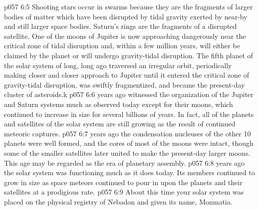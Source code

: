 \vs p057 6:5 Shooting stars occur in swarms because they are the fragments of larger bodies of matter which have been disrupted by tidal gravity exerted by near\hyp{}by and still larger space bodies. Saturn’s rings are the fragments of a disrupted satellite. One of the moons of Jupiter is now approaching dangerously near the critical zone of tidal disruption and, within a few million years, will either be claimed by the planet or will undergo gravity\hyp{}tidal disruption. The fifth planet of the solar system of long, long ago traversed an irregular orbit, periodically making closer and closer approach to Jupiter until it entered the critical zone of gravity\hyp{}tidal disruption, was swiftly fragmentized, and became the present\hyp{}day cluster of asteroids.k
\vs p057 6:6 \pc {} years ago witnessed the organization of the Jupiter and Saturn systems much as observed today except for their moons, which continued to increase in size for several billions of years. In fact, all of the planets and satellites of the solar system are still growing as the result of continued meteoric captures.
\vs p057 6:7 \pc {} years ago the condensation nucleuses of the other 10 planets were well formed, and the cores of most of the moons were intact, though some of the smaller satellites later united to make the present\hyp{}day larger moons. This age may be regarded as the era of planetary assembly.
\vs p057 6:8 \pc {} years ago the solar system was functioning much as it does today. Its members continued to grow in size as space meteors continued to pour in upon the planets and their satellites at a prodigious rate.
\vs p057 6:9 About this time your solar system was placed on the physical registry of Nebadon and given its name, Monmatia.
